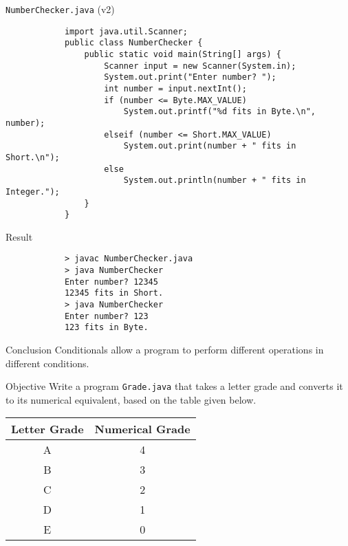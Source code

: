\documentclass[10pt, compress]{beamer}
\begin{document}
\begin{slide}
	\begin{block}{\texttt{NumberChecker.java} (v2)}
		\begin{verbatim}
			import java.util.Scanner;
			public class NumberChecker {
			    public static void main(String[] args) {
			        Scanner input = new Scanner(System.in);
			        System.out.print("Enter number? ");
			        int number = input.nextInt();
			        if (number <= Byte.MAX_VALUE)
			            System.out.printf("%d fits in Byte.\n", number);
			        elseif (number <= Short.MAX_VALUE)
			            System.out.print(number + " fits in Short.\n");
			        else
			            System.out.println(number + " fits in Integer.");
			    }
			}
		\end{verbatim}
	\end{block}
\end{slide}

\begin{slide}
	\begin{block}{Result}
		\begin{verbatim}
			> javac NumberChecker.java
			> java NumberChecker
			Enter number? 12345
			12345 fits in Short.
			> java NumberChecker
			Enter number? 123
			123 fits in Byte.
		\end{verbatim}
	\end{block}
	\begin{block}{Conclusion}
		Conditionals allow a program to perform different operations in different conditions.
	\end{block}
\end{slide}

\begin{slide}
	\begin{block}{Objective}
		Write a program \texttt{Grade.java} that takes a letter grade and converts it to its numerical equivalent, based on the table given below.
		\begin{table}[H]
			\begin{tabular}{c|c}
				Letter Grade & Numerical Grade\\
				\hline
				A & 4\\
				B & 3\\
				C & 2\\
				D & 1\\
				E & 0\\
			\end{tabular}
		\end{table}
	\end{block}
\end{slide}
\end{document}
